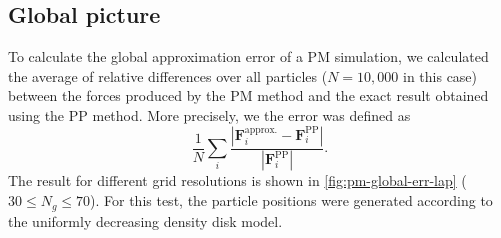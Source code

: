 \subsection{Global picture}\label{subsubsec:pm-global-picture}
To calculate the global approximation error of a PM simulation, we calculated the average of relative differences over all particles ($N=10{,}000$ in this case) between the forces produced by the PM method and the exact result obtained using the PP method.
More precisely, we the error was defined as
\begin{equation}\label{eq:force-avg-relative-err}
    \frac{1}{N}\sum_{i} \frac{|\mathbf{F}_i^\text{approx.} - \mathbf{F}_i^\text{PP}|}{|\mathbf{F}_i^\text{PP}|}.
\end{equation}
The result for different grid resolutions is shown in \autoref{fig:pm-global-err-lap} ( $30 \leq N_g \leq 70$).
For this test, the particle positions were generated according to the uniformly decreasing density disk model.
